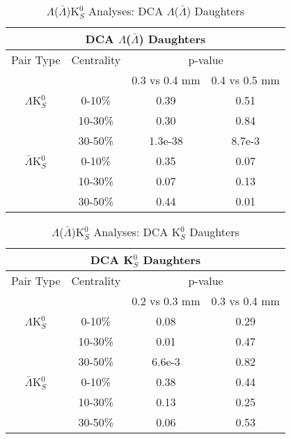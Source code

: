 \documentclass[../AnalysisNoteJBuxton.tex]{subfiles}
\begin{document}
\begin{table}
 \centering
 \begin{tabular}{|c|c|c|c|}
 \multicolumn{4}{c}{DCA $\Lambda$($\bar{\Lambda}$) Daughters} \\
  \hline
  Pair Type & Centrality & \multicolumn{2}{c|}{p-value} \\
  \cline{3-4}
   & & 0.3 vs 0.4 mm & 0.4 vs 0.5 mm \\
  \hline
  $\Lambda$K$^{0}_{S}$ & 0-10\% & 0.39 & 0.51 \\
   & 10-30\% & 0.30 & 0.84 \\
   & 30-50\% & 1.3e-38 & 8.7e-3 \\
  \hline
  $\bar{\Lambda}$K$^{0}_{S}$ & 0-10\% & 0.35 & 0.07 \\
   & 10-30\% & 0.07 & 0.13 \\
   & 30-50\% & 0.44 & 0.01 \\
  \hline
 \end{tabular}
 \caption{$\Lambda$($\bar{\Lambda}$)K$^{0}_{S}$ Analyses: DCA $\Lambda$($\bar{\Lambda}$) Daughters}
 \label{tab:LamDaughtersDcaLamK0}
\end{table}

\begin{table}
 \centering
 \begin{tabular}{|c|c|c|c|}
 \multicolumn{4}{c}{DCA K$^{0}_{S}$ Daughters} \\
  \hline
  Pair Type & Centrality & \multicolumn{2}{c|}{p-value} \\
  \cline{3-4}
   & & 0.2 vs 0.3 mm & 0.3 vs 0.4 mm \\
  \hline
  $\Lambda$K$^{0}_{S}$ & 0-10\% & 0.08 & 0.29 \\
   & 10-30\% & 0.01 & 0.47 \\
   & 30-50\% & 6.6e-3 & 0.82 \\
  \hline
  $\bar{\Lambda}$K$^{0}_{S}$ & 0-10\% & 0.38 & 0.44 \\
   & 10-30\% & 0.13 & 0.25 \\
   & 30-50\% & 0.06 & 0.53 \\
  \hline
 \end{tabular}
 \caption{$\Lambda$($\bar{\Lambda}$)K$^{0}_{S}$ Analyses: DCA K$^{0}_{S}$ Daughters}
 \label{tab:K0DaughtersDcaLamK0}
\end{table}
\end{document}
